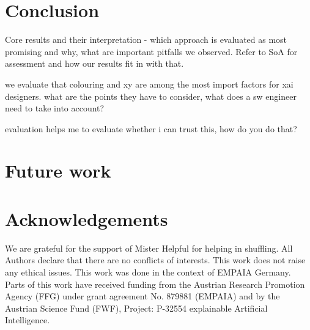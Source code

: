 \section{Conclusion}
\label{sec:Conclusion}

Core results and their interpretation - which approach is evaluated as most promising and why, what are important pitfalls we observed. Refer to SoA for assessment and how our results fit in with that.

we evaluate that colouring and xy are among the most import factors for xai designers. what are the points they have to consider, what does a sw engineer need to take into account?

evaluation helps me to evaluate whether i can trust this, how do you do that?

\section{Future work}
\label{sec:FutureWork}
\section*{Acknowledgements}

We are grateful for the support of Mister Helpful for helping in shuffling. All Authors declare that there are no conflicts of interests. This work does not raise any ethical issues. This work was done in the context of EMPAIA Germany. Parts of this work have received funding from the Austrian Research Promotion Agency (FFG) under grant agreement No. 879881 (EMPAIA) and by the Austrian Science Fund (FWF), Project: P-32554 explainable Artificial Intelligence. 
